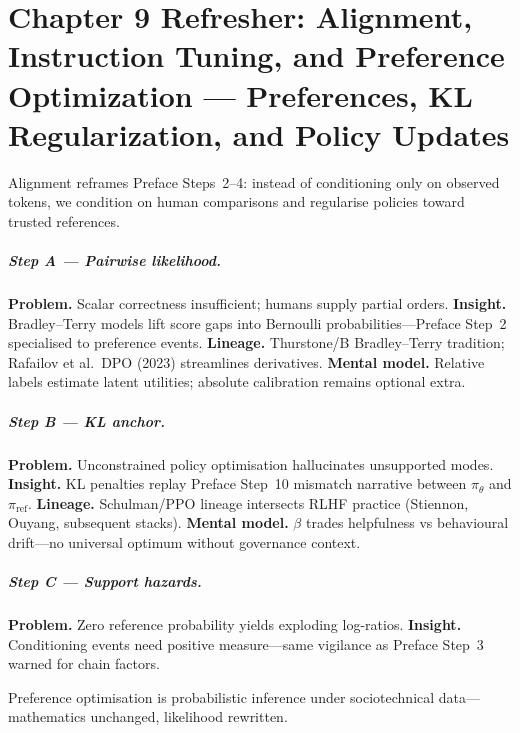 \chapter{Chapter 9 Refresher: Alignment, Instruction Tuning, and Preference Optimization --- Preferences, KL Regularization, and Policy Updates}
\label{chap:alignment}

\scenelabel
Alignment reframes Preface Steps~2--4: instead of conditioning only on observed tokens, we condition on human comparisons and regularise policies toward trusted references.

\paragraph{Step A --- Pairwise likelihood.}
\textbf{Problem.} Scalar correctness insufficient; humans supply partial orders.
\textbf{Insight.} Bradley--Terry models lift score gaps into Bernoulli probabilities---Preface Step~2 specialised to preference events.
\textbf{Lineage.} Thurstone/B Bradley--Terry tradition; Rafailov et al.\ DPO (2023) streamlines derivatives.
\textbf{Mental model.} Relative labels estimate latent utilities; absolute calibration remains optional extra.

\paragraph{Step B --- KL anchor.}
\textbf{Problem.} Unconstrained policy optimisation hallucinates unsupported modes.
\textbf{Insight.} KL penalties replay Preface Step~10 mismatch narrative between \(\pi_\theta\) and \(\pi_{\mathrm{ref}}\).
\textbf{Lineage.} Schulman/PPO lineage intersects RLHF practice (Stiennon, Ouyang, subsequent stacks).
\textbf{Mental model.} \(\beta\) trades helpfulness vs behavioural drift---no universal optimum without governance context.

\paragraph{Step C --- Support hazards.}
\textbf{Problem.} Zero reference probability yields exploding log-ratios.
\textbf{Insight.} Conditioning events need positive measure---same vigilance as Preface Step~3 warned for chain factors.

Preference optimisation is probabilistic inference under sociotechnical data---mathematics unchanged, likelihood rewritten.

